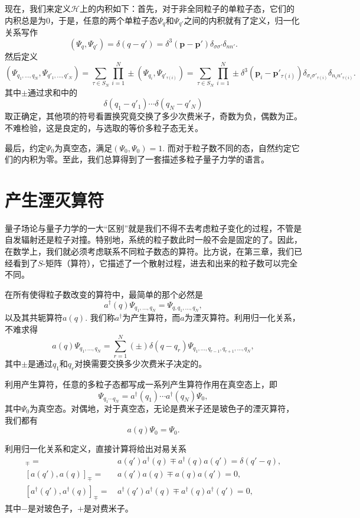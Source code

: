\documentclass[11pt]{article}
\theoremstyle{definition}
\theoremstyle{plain}
\begin{document}
现在，我们来定义$\mathcal{H}$上的内积如下：首先，对于非全同粒子的单粒子态，它们的内积总是为$0$，于是，任意的两个单粒子态$\Psi_q$和$\Psi_{q'}$之间的内积就有了定义，归一化关系写作
\[
	(\Psi_q,\Psi_{q'})=\delta(q-q')=\delta^{3}\left(\bm{p}-\bm{p}'\right)\delta_{\sigma\sigma'}\delta_{nn'}.
\]
然后定义
\[
	(\Psi_{q_1,\dots,q_N},\Psi_{q'_1,\dots,q'_N})=\sum_{\tau\in S_N}\prod_{i=1}^N\pm (\Psi_{q_i},\Psi_{q'_{\tau(i)}})=\sum_{\tau\in S_N}\prod_{i=1}^N\pm \delta^{3}\left(\bm{p}_i-\bm{p}'_{\tau(i)}\right)\delta_{\sigma_i\sigma'_{\tau(i)}}\delta_{n_in'_{\tau(i)}}.
\]
其中$\pm$通过求和中的
\[
	\delta(q_1-q'_1)\cdots \delta(q_N-q'_N)
\]
取正确定，其他项的符号看置换究竟交换了多少次费米子，奇数为负，偶数为正。不难检验，这是良定的，与选取的等价多粒子态无关。

最后，约定$\Psi_0$为真空态，满足$(\Psi_0,\Psi_0)=1$. 而对于粒子数不同的态，自然约定它们的内积为零。至此，我们总算得到了一套描述多粒子量子力学的语言。

\section{产生湮灭算符}

量子场论与量子力学的一大“区别”就是我们不得不去考虑粒子变化的过程，不管是自发辐射还是粒子对撞。特别地，系统的粒子数此时一般不会是固定的了。因此，在数学上，我们就必须考虑联系不同粒子数态的算符。比方说，在第三章，我们已经看到了$S$-矩阵（算符），它描述了一个散射过程，进去和出来的粒子数可以完全不同。

在所有使得粒子数改变的算符中，最简单的那个必然是
\[
	a^\dag(q)\Psi_{q_1,\dots,q_N}=\Psi_{q,q_1,\dots,q_N},
\]
以及其共轭算符$a(q)$. 我们称$a^\dag$为产生算符，而$a$为湮灭算符。利用归一化关系，不难求得
\[
	a(q)\Psi_{q_1,\dots,q_N}=\sum_{r=1}^N(\pm)\delta(q-q_r)\Psi_{q_1,\dots,q_{r-1},q_{r+1},\dots,q_N},
\]
其中$\pm$是通过$q_1$和$q_r$对换需要交换多少次费米子决定的。

利用产生算符，任意的多粒子态都写成一系列产生算符作用在真空态上，即
\[
	\Psi_{q_1 \cdots q_N}=a^\dag(q_1)\cdots a^\dag(q_N)\Psi_0,
\]
其中$\Psi_0$为真空态。对偶地，对于真空态，无论是费米子还是玻色子的湮灭算符，我们都有
\[
	a(q)\Psi_0=\Psi_0.
\]

利用归一化关系和定义，直接计算将给出对易关系
\begin{align*}
	[a(q'),a^\dag(q)]_\mp = &\, a(q')a^\dag(q)\mp a^\dag(q)a(q')=\delta(q'-q),\\
	[a(q'),a(q)]_\mp = &\, a(q')a(q)\mp a(q)a(q')=0,\\
	[a^\dag(q'),a^\dag(q)]_\mp = &\, a^\dag(q')a^\dag(q)\mp a^\dag(q)a^\dag(q')=0,
\end{align*}
其中$-$是对玻色子，$+$是对费米子。
\end{document}
